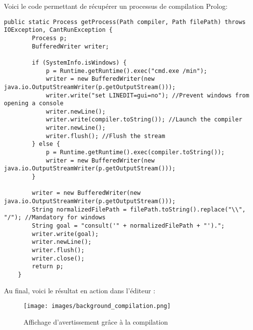 \noindent Voici le code permettant de récupérer un processus de compilation Prolog:
\begin{lstlisting}[label={lst:get_prolog_process}, caption={Méthode de créer un processus de compilation Prolog}]
    public static Process getProcess(Path compiler, Path filePath) throws IOException, CantRunException {
        Process p;
        BufferedWriter writer;

        if (SystemInfo.isWindows) {
            p = Runtime.getRuntime().exec("cmd.exe /min");
            writer = new BufferedWriter(new java.io.OutputStreamWriter(p.getOutputStream()));
            writer.write("set LINEDIT=gui=no"); //Prevent windows from opening a console
            writer.newLine();
            writer.write(compiler.toString()); //Launch the compiler
            writer.newLine();
            writer.flush(); //Flush the stream
        } else {
            p = Runtime.getRuntime().exec(compiler.toString());
            writer = new BufferedWriter(new java.io.OutputStreamWriter(p.getOutputStream()));
        }

        writer = new BufferedWriter(new java.io.OutputStreamWriter(p.getOutputStream()));
        String normalizedFilePath = filePath.toString().replace("\\", "/"); //Mandatory for windows
        String goal = "consult('" + normalizedFilePath + "').";
        writer.write(goal);
        writer.newLine();
        writer.flush();
        writer.close();
        return p;
    }
\end{lstlisting}

\noindent Au final, voici le résultat en action dans l'éditeur :
\begin{figure}[h]
    \centering
    \texttt{[image: images/background\_compilation.png]}
    \caption{Affichage d'avertissement grâce à la compilation}
    \label{fig:compilation_warnings}
\end{figure}